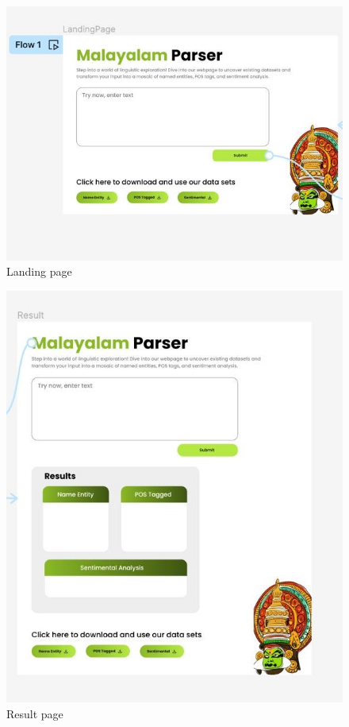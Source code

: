 \documentclass[12pt,a4paper,titlepage]{report}
\begin{document}
	\begin{figure}[H]
		\centering
		\includegraphics[width=14cm]{./landing.jpg}
		\caption{Landing page}
	\end{figure}
	
	\begin{figure}[H]
		\centering
		\includegraphics[width=14cm]{./result.jpg}
		\caption{Result page}
	\end{figure}
	
\end{document}
